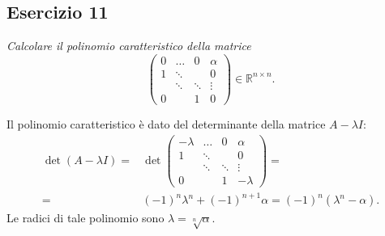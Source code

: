 \subsection{Esercizio 11}
\label{sub:es11}
\emph{Calcolare il polinomio caratteristico della matrice
			\[
				\begin{pmatrix}
					0 & \dots & 0 & \alpha\\
					1 & \ddots & & 0\\
					& \ddots & \ddots & \vdots\\
					0 & & 1 & 0
				\end{pmatrix}\in\mathbb{R}^{n\times n}.
			\]}
\begin{sol}
	\normalfont Il polinomio caratteristico è dato del determinante della matrice $A-\lambda I$:
	\begin{equation}
    \begin{split}\det{(A-\lambda I)}=&\det{\begin{pmatrix}-\lambda&\ldots&0&\alpha\\1&\ddots&&0\\&\ddots&\ddots&\vdots\\0&&1&-\lambda\end{pmatrix}}=\\=&(-1)^n\lambda^n+(-1)^{n+1}\alpha=(-1)^n(\lambda^n-\alpha).\end{split}
  \end{equation}
  Le radici di tale polinomio sono $\lambda=\sqrt[n]{\alpha}$.
\end{sol}


